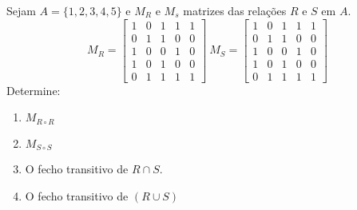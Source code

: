 \item 
		Sejam $A=\{1,2,3,4,5\}$ e $M_R$ e $M_s$ matrizes das relações $R$ e $S$ em $A$.
\[ 
M_R=\begin{bmatrix}
1 & 0 & 1 & 1 & 1\\
0 & 1 & 1 & 0 & 0\\
1 & 0 & 0 & 1 & 0\\
1 & 0 & 1 & 0 & 0\\
0 & 1 & 1 & 1 & 1
\end{bmatrix}
\
M_S=\begin{bmatrix}
1 & 0 & 1 & 1 & 1\\
0 & 1 & 1 & 0 & 0\\
1 & 0 & 0 & 1 & 0\\
1 & 0 & 1 & 0 & 0\\
0 & 1 & 1 & 1 & 1
\end{bmatrix}
\]
Determine:
\begin{multicols}{2}  
\begin{enumerate}
		\item $M_{R\circ R}$
		\item $M_{S\circ S}$
		\item O fecho transitivo de ${R\cap S}$.
		\item O fecho transitivo de $(R\cup S)$
\end{enumerate}
\end{multicols}
